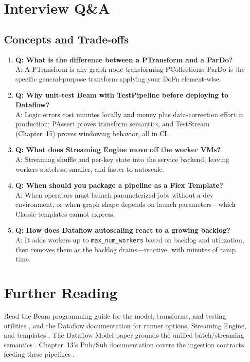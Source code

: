 \section{Interview Q\&A}
\subsection{Concepts and Trade-offs}
\begin{enumerate}
    \item \textbf{Q: What is the difference between a PTransform and a ParDo?}\\
    A: A PTransform is any graph node transforming PCollections; ParDo is the specific general-purpose transform applying your DoFn element-wise.

    \item \textbf{Q: Why unit-test Beam with TestPipeline before deploying to Dataflow?}\\
    A: Logic errors cost minutes locally and money plus data-correction effort in production; PAssert proves transform semantics, and TestStream (Chapter~15) proves windowing behavior, all in CI.

    \item \textbf{Q: What does Streaming Engine move off the worker VMs?}\\
    A: Streaming shuffle and per-key state into the service backend, leaving workers stateless, smaller, and faster to autoscale.

    \item \textbf{Q: When should you package a pipeline as a Flex Template?}\\
    A: When operators must launch parameterized jobs without a dev environment, or when graph shape depends on launch parameters---which Classic templates cannot express.

    \item \textbf{Q: How does Dataflow autoscaling react to a growing backlog?}\\
    A: It adds workers up to \texttt{max\_num\_workers} based on backlog and utilization, then removes them as the backlog drains---reactive, with minutes of ramp time.
\end{enumerate}

\section{Further Reading}
Read the Beam programming guide for the model, transforms, and testing utilities \cite{apachebeamdocs}, and the Dataflow documentation for runner options, Streaming Engine, and templates \cite{googleclouddataflowdocs}. The Dataflow Model paper grounds the unified batch/streaming semantics \cite{akidau2015dataflow}. Chapter~13's Pub/Sub documentation covers the ingestion contracts feeding these pipelines \cite{googlecloudpubsubdocs}.

